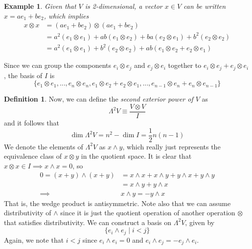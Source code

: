 \documentclass{article}
\newtheorem{example}{Example}[section]
\theoremstyle{remark}
\theoremstyle{definition}
\newtheorem{definition}{Definition}[section]
\begin{document}
\begin{example}
Given that $V$ is 2-dimensional, a vector $x \in V$ can be written $x = a e_1 + b e_2$, which implies
\begin{align*}
    x \otimes x & = (a e_1 + b e_2) \otimes (a e_1 + b e_2) \\
    & = a^2 (e_1 \otimes e_1) + a b (e_1 \otimes e_2) + b a (e_2 \otimes e_1) + b^2 (e_2 \otimes e_2) \\
    & = a^2 (e_1 \otimes e_1) + b^2 (e_2 \otimes e_2) + a b (e_1 \otimes e_2 + e_2 \otimes e_1) 
\end{align*}
\end{example}

Since we can group the components $e_i \otimes e_j$ and $e_j \otimes e_i$ together to $e_i \otimes e_j + e_j \otimes e_i$, the basis of $I$ is 
\[\{e_1 \otimes e_1, ..., e_n \otimes e_n, e_1 \otimes e_2 + e_2 \otimes e_1, ..., e_{n-1} \otimes e_n + e_n \otimes e_{n-1}\}\]

\begin{definition}
Now, we can define the \textit{second exterior power of $V$} as
\[\Lambda^2 V \equiv \frac{V \otimes V}{I}\]
and it follows that 
\[\dim{\Lambda^2 V} = n^2 - \dim{I} = \frac{1}{2} n (n-1)\]
We denote the elements of $\Lambda^2 V$ as $x \wedge y$, which really just represents the equivalence class of $x \otimes y$ in the quotient space. It is clear that $x \otimes x \in I \implies x \wedge x = 0$, so
\begin{align*}
    0 = (x + y) \wedge (x + y) & = x \wedge x + x \wedge y + y \wedge x + y \wedge y \\
    & = x \wedge y + y \wedge x \\
    \implies & x \wedge y = - y \wedge x
\end{align*}
That is, the wedge product is antisymmetric. Note also that we can assume distributivity of $\wedge$ since it is just the quotient operation of another operation $\otimes$ that satisfies distributivity. We can construct a basis on $\Lambda^2 V$, given by 
\[\{e_i \wedge e_j \; | \; i < j\}\]
Again, we note that $i < j$ since $e_i \wedge e_i = 0$ and $e_i \wedge e_j = - e_j \wedge e_i$. 
\end{definition}
\end{document}
